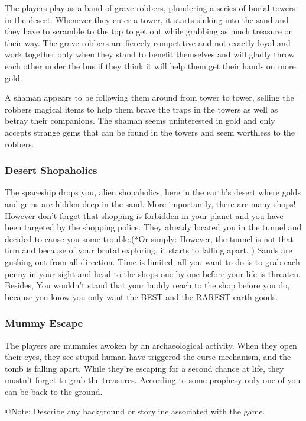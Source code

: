 The players play as a band of grave robbers, plundering a series of burial towers in the desert. Whenever they enter a tower, it starts sinking into the sand and they have to scramble to the top to get out while grabbing as much treasure on their way. The grave robbers are fiercely competitive and not exactly loyal and work together only when they stand to benefit themselves and will gladly throw each other under the bus if they think it will help them get their hands on more gold.

A shaman appears to be following them around from tower to tower, selling the robbers magical items to help them brave the traps in the towers as well as betray their companions. The shaman seems uninterested in gold and only accepts strange gems that can be found in the towers and seem worthless to the robbers.

\subsubsection{Desert Shopaholics}

The spaceship drops you, alien shopaholics, here in the earth's desert where golds and gems are hidden deep in the sand. More importantly, there are many shops! However don't forget that shopping is forbidden in your planet and you have been targeted by the shopping police. They already located you in the tunnel and decided to cause you some trouble.(*Or simply: However, the tunnel is not that firm and because of your brutal exploring, it starts to falling apart. ) Sands are gushing out from all direction. Time is limited, all you want to do is to grab each penny in your sight and head to the shops one by one before your life is threaten. Besides, You wouldn't stand that your buddy reach to the shop before you do, because you know you only want the BEST and the RAREST earth goods.


\subsubsection{Mummy Escape}

The players are mummies awoken by an archaeological activity. When they open their eyes, they see stupid human have triggered the curse mechanism, and the tomb is falling apart. While they're escaping for a second chance at life, they mustn't forget to grab the treasures. According to some prophesy only one of you can be back to the ground.


\begin{TempText}
    
    
    
	@Note: Describe any background or storyline associated with the game.
\end{TempText}


